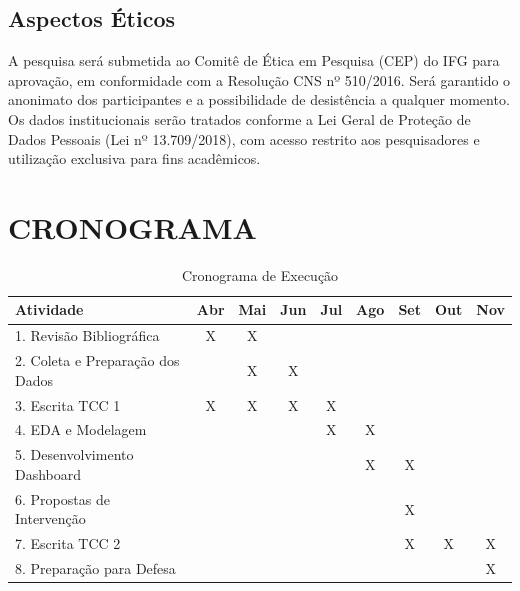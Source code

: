 \documentclass[12pt,a4paper]{article}
\begin{document}
\subsection{Aspectos Éticos}

A pesquisa será submetida ao Comitê de Ética em Pesquisa (CEP) do IFG para aprovação, em conformidade com a Resolução CNS nº 510/2016. Será garantido o anonimato dos participantes e a possibilidade de desistência a qualquer momento. Os dados institucionais serão tratados conforme a Lei Geral de Proteção de Dados Pessoais (Lei nº 13.709/2018), com acesso restrito aos pesquisadores e utilização exclusiva para fins acadêmicos.

\section{CRONOGRAMA}

\begin{table}[h!]
\centering
\caption{Cronograma de Execução}
\label{tab:cronograma}
\begin{tabular}{lcccccccc}
\toprule
\textbf{Atividade} & \textbf{Abr} & \textbf{Mai} & \textbf{Jun} & \textbf{Jul} & \textbf{Ago} & \textbf{Set} & \textbf{Out} & \textbf{Nov} \\
\midrule
1. Revisão Bibliográfica     & X & X &   &   &   &   &   &   \\
2. Coleta e Preparação dos Dados &   & X & X &   &   &   &   &   \\
3. Escrita TCC 1             & X & X & X & X &   &   &   &   \\
4. EDA e Modelagem          &   &   &   & X & X &   &   &   \\
5. Desenvolvimento Dashboard &   &   &   &   & X & X &   &   \\
6. Propostas de Intervenção &   &   &   &   &   & X &   &   \\
7. Escrita TCC 2             &   &   &   &   &   & X & X & X \\
8. Preparação para Defesa   &   &   &   &   &   &   &   & X \\
\bottomrule
\end{tabular}
\end{table}

\newpage
{}
\printbibliography[title={REFERÊNCIAS BIBLIOGRÁFICAS}]
\end{document}
